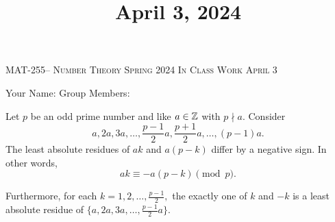 \documentclass[handout]{ximera}
\title{April 3, 2024}
\begin{document}
\handoutAbstract
\maketitle
 	\begin{center}%
    	{\large \scshape MAT-255-- Number Theory 
			\hfill Spring 2024 
			\hfill In Class Work April 3}%
    
		{\large Your Name: \hrulefill \quad 
			Group Members:\hrulefill \quad 
			\hrulefill
			\par}%
 	\end{center}%
	 
\begin{lemma}\label{lem:residues-gauss-lem}
    Let $p$ be an odd prime number and like $a\in\mathbb Z$ with $p\nmid a.$ Consider  
        \[a,2a,3a,\dots,\frac{p-1}{2}a,\frac{p+1}{2}a,\dots,(p-1)a.\] 
    The least absolute residues of $ak$ and $a(p-k)$ differ by a negative sign. In other words, 
        \[ak\equiv -a(p-k)\pmod{p}.\]
        
    Furthermore, for each $k=1,2,\dots,\frac{p-1}{2},$ the exactly one of $k$ and $-k$ is a least absolute residue of $\{a,2a,3a,\dots,\frac{p-1}{2}a\}.$
\end{lemma}
\end{document}
